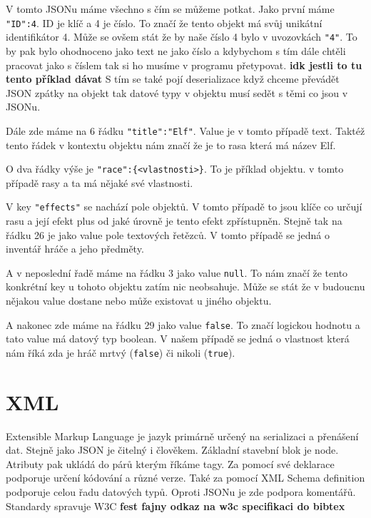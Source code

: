 V tomto JSONu máme všechno s čím se můžeme potkat. Jako první máme \verb|"ID":4|. ID je klíč a 4 je číslo. To značí že tento objekt má svůj unikátní identifikátor 4. Může se ovšem stát že by naše číslo 4 bylo v uvozovkách \verb|"4"|. To by pak bylo ohodnoceno jako text ne jako číslo a kdybychom s tím dále chtěli pracovat jako s číslem tak si ho musíme v programu přetypovat. \textbf{idk jestli to tu tento příklad dávat } S tím se také pojí deserializace když chceme převádět JSON zpátky na objekt tak datové typy v objektu musí sedět s těmi co jsou v JSONu.

Dále zde máme na 6 řádku \verb|"title":"Elf"|. Value je v tomto případě text. Taktéž tento řádek v kontextu objektu nám značí že je to rasa která má název Elf.

O dva řádky výše je \verb|"race":{<vlastnosti>}|. To je příklad objektu. v tomto případě rasy a ta má nějaké své vlastnosti.

V key \texttt{"effects"} se nachází pole objektů. V tomto případě to jsou klíče co určují rasu a její efekt plus od jaké úrovně je tento efekt zpřístupněn. Stejně tak na řádku 26 je jako value pole textových řetězců. V tomto případě se jedná o inventář hráče a jeho předměty.

A v neposlední řadě máme na řádku 3 jako value \texttt{null}. To nám značí že tento konkrétní key u tohoto objektu zatím nic neobsahuje. Může se stát že v budoucnu nějakou value dostane nebo může existovat u jiného objektu.

A nakonec zde máme na řádku 29 jako value \texttt{false}. To značí logickou hodnotu a tato value má datový typ boolean. V našem případě se jedná o vlastnost která nám říká zda je hráč mrtvý (\texttt{false}) či nikoli (\texttt{true}).


\section{XML}
Extensible Markup Language je jazyk primárně určený na serializaci a přenášení dat. Stejně jako JSON je čitelný i člověkem. Základní stavební blok je node. Atributy pak ukládá do párů kterým říkáme tagy. Za pomocí své deklarace podporuje určení kódování a různé verze. Také za pomocí XML Schema definition podporuje celou řadu datových typů. Oproti JSONu je zde podpora komentářů. Standardy spravuje W3C \textbf{fest fajny odkaz na w3c specifikaci do bibtex} %


